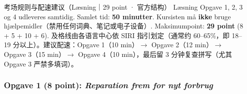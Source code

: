 

\begin{tipbox}{考场规则与配速建议（Læsning｜29 point · 官方结构）}
\small
Læsning Opgave 1, 2, 3 og 4 udleveres samtidig. Samlet tid: \textbf{50 minutter}. Kursisten må \textbf{ikke} bruge hjælpemidler（禁用任何词典、笔记或电子设备）. Maksimumpoint: \textbf{29 point} (8 + 5 + 10 + 6). 及格线由各语言中心依 SIRI 指引划定（通常约 60--65\%，即 18--19 分以上）。建议配速：Opgave 1（10 min）$\rightarrow$ Opgave 2（12 min）$\rightarrow$ Opgave 3（15 min）$\rightarrow$ Opgave 4（10 min），最后留 3 分钟复查拼写（尤其 Opgave 3 严禁多填词）。
\end{tipbox}

\subsubsection*{Opgave 1 (8 point): \textit{Reparation frem for nyt forbrug}}

